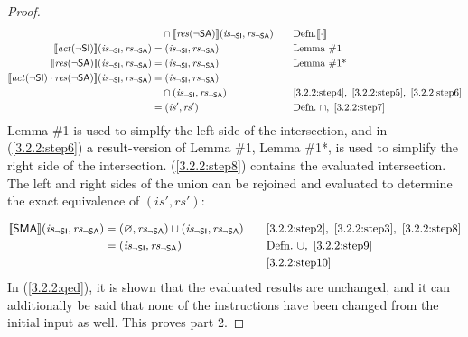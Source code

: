 \documentclass[12pt, letterpaper]{article}
\let\emptyset\varnothing
\newcommand\interp[1]{\llbracket #1 \rrbracket}
\begin{document}
\begin{proof}
{\begin{alignat}{2}
     &\quad \cap
     \interp{ \mathit{res}(\neg\mathsf{SA}) } (\mathit{is_{\mathsf{\neg SI}}}, \mathit{rs_{\mathsf{\neg SA}}})
     &&\quad \text{Defn.} \interp{\cdot}
     \\
     \label{3.2.2:step5}
     \interp{ \mathit{act}(\neg\mathsf{SI}) } (\mathit{is_{\mathsf{\neg SI}}}, \mathit{rs_{\mathsf{\neg SA}}})
     &=
     (\mathit{is_{\mathsf{\neg SI}}}, \mathit{rs_{\mathsf{\neg SA}}})
     &&\quad \text{Lemma \#1}
     \\
     \label{3.2.2:step6}
     \interp{ \mathit{res}(\neg\mathsf{SA}) } (\mathit{is_{\mathsf{\neg SI}}}, \mathit{rs_{\mathsf{\neg SA}}})
     &=
     (\mathit{is_{\mathsf{\neg SI}}}, \mathit{rs_{\mathsf{\neg SA}}})
     &&\quad \text{Lemma \#1*} %
     \\
     \label{3.2.2:step7}
     \interp{ \mathit{act}(\neg\mathsf{SI}) \cdot
      \mathit{res}(\neg\mathsf{SA}) } (\mathit{is_{\mathsf{\neg SI}}}, \mathit{rs_{\mathsf{\neg SA}}})
     &=
     (\mathit{is_{\mathsf{\neg SI}}}, \mathit{rs_{\mathsf{\neg SA}}})\\ \nonumber
     &\quad \cap
     (\mathit{is_{\mathsf{\neg SI}}}, \mathit{rs_{\mathsf{\neg SA}}})
     &&\quad \ref{3.2.2:step4},\ \ref{3.2.2:step5},\ \ref{3.2.2:step6}
     \\
     \label{3.2.2:step8}
     &=
     (\mathit{is}', \mathit{rs}')
     &&\quad \text{Defn.}\ \cap,\ \ref{3.2.2:step7}
 \end{alignat}
 }%
     Lemma \#1 is used to simplfy the left side of the intersection, and in (\ref{3.2.2:step6}) a result-version of Lemma \#1, Lemma \#1*, is used to simplify the right side of the intersection. (\ref{3.2.2:step8}) contains the evaluated intersection.\\
     The left and right sides of the union can be rejoined and evaluated to determine the exact equivalence of $(\mathit{is}', \mathit{rs}')$:
 \par\nobreak
 {\fontsize{10pt}{12pt}\selectfont
 \begin{alignat}{2}
     \label{3.2.2:step9}
     \interp{ \mathsf{SMA} } (\mathit{is_{\mathsf{\neg SI}}}, \mathit{rs_{\mathsf{\neg SA}}})
     &=
     (\emptyset, \mathit{rs_{\mathsf{\neg SA}}}) \cup
     (\mathit{is_{\mathsf{\neg SI}}}, \mathit{rs_{\mathsf{\neg SA}}})
     &&\quad \ref{3.2.2:step2},\ \ref{3.2.2:step3},\ \ref{3.2.2:step8}
     \\
     \label{3.2.2:step10}
     &=
     (\mathit{is_{\mathsf{\neg SI}}}, \mathit{rs_{\mathsf{\neg SA}}})
     &&\quad \text{Defn.}\ \cup,\ \ref{3.2.2:step9}
     \\
     \label{3.2.2:qed}
     &\qedhere
     &&\quad \ref{3.2.2:step10}
 \end{alignat}
 }%
     In (\ref{3.2.2:qed}), it is shown that the evaluated results are unchanged, and it can additionally be said that none of the instructions have been changed from the initial input as well.  This proves part 2.
  \end{proof}
\end{document}
